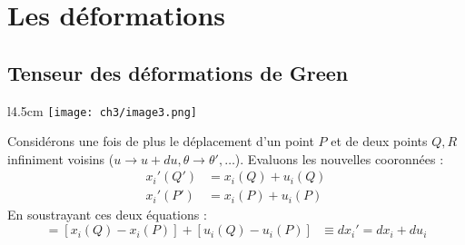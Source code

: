       
      
      
      
\section{Les déformations}
    
\subsection{Tenseur des déformations de Green}
\begin{wrapfigure}[9]{l}{4.5cm}
	\texttt{[image: ch3/image3.png]}
\end{wrapfigure}
Considérons une fois de plus le déplacement d'un point $P$ et de deux points $Q,R$ infiniment
voisins ($u \rightarrow u+du, \theta \rightarrow \theta', \dots$). Evaluons les nouvelles 
cooronnées :
\begin{equation}
	\begin{array}{ll}
		x_i'(Q') & = x_i(Q) + u_i(Q) \\
		x_i'(P') & = x_i(P) + u_i(P) 
	\end{array}
\end{equation}
En soustrayant ces deux équations :
\begin{equation}
	[x_i'(Q') - x_i'(P')] = [x_i(Q)-x_i(P)]+[u_i(Q) - u_i(P)]\ \ \ \equiv dx_i' = dx_i + du_i
\end{equation}
     
